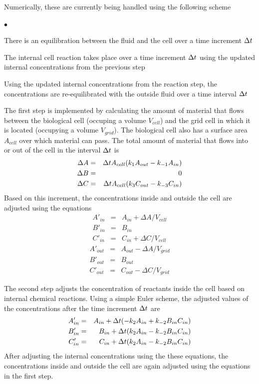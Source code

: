 \documentclass[12pt]{article}
\begin{document}
Numerically, these are currently being handled using the following scheme
\begin{list}{$\bullet$}{}
\item There is an equilibration between the fluid and the cell over a time
increment $\Delta t$
\item The internal cell reaction takes place over a time increment $\Delta t$
using the updated internal concentrations from the previous step
\item Using the updated internal concentrations from the reaction step, the
concentrations are re-equilibrated with the outside fluid over a time interval
$\Delta t$
\end{list}
The first step is implemented by calculating the amount of material that flows
between the biological cell (occuping a volume $V_{cell}$) and the grid cell in
which it is located (occupying a volume $V_{grid}$). The biological cell also has
a surface area $A_{cell}$ over which material can pass. The total amount of
material that flows into or out of the cell in the interval $\Delta t$ is
\begin{eqnarray*}
\Delta A & = & \Delta t A_{cell}(k_1 A_{out}-k_{-1} A_{in}) \\
\Delta B & = & 0 \\
\Delta C & = & \Delta t A_{cell}(k_3 C_{out}-k_{-3} C_{in}) \\
\end{eqnarray*}
Based on this increment, the concentrations inside and outside the cell are
adjusted using the equations
\begin{eqnarray*}
A'_{in} &=& A_{in} + \Delta A/V_{cell} \\
B'_{in}  & = & B_{in} \\
C'_{in} &=& C_{in} + \Delta C/V_{cell}
\end{eqnarray*}
\begin{eqnarray*}
A'_{out} &=& A_{out} - \Delta A/V_{grid} \\
B'_{out}  & = & B_{out} \\
C'_{out} &=& C_{out} - \Delta C/V_{grid}
\end{eqnarray*}

The second step adjusts the concentration of reactants inside the cell based on
internal chemical reactions. Using a simple Euler scheme, the adjusted values of
the concentrations after the time increment $\Delta t$ are
\begin{eqnarray*}
A'_{in} &=& A_{in} + \Delta t(-k_2 A_{in} + k_{-2} B_{in} C_{in}) \\
B'_{in} &=& B_{in} + \Delta t(k_2 A_{in} - k_{-2} B_{in} C_{in}) \\
C'_{in} &=& C_{in} + \Delta t(k_2 A_{in} - k_{-2} B_{in} C_{in})
\end{eqnarray*}
After adjusting the internal concentrations using the these equations, the
concentrations inside and outside the cell are again adjusted using the
equations in the first step.
\end{document}

